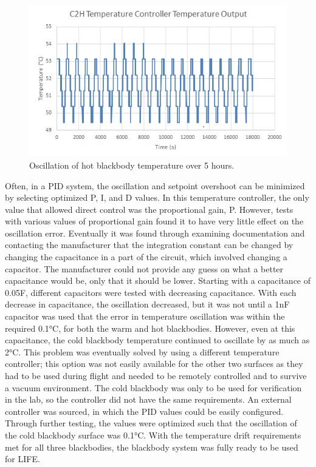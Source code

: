 \begin{figure}
    \centering
    \includegraphics{chap3_images/C2H_temperature_oscillation_excel.png}
    \caption{Oscillation of hot blackbody temperature over 5 hours.}
    \label{fig:C2H_temp_oscillation}
\end{figure}

Often, in a PID system, the oscillation and setpoint overshoot can be minimized by selecting optimized P, I, and D values. In this temperature controller, the only value that allowed direct control was the proportional gain, P. However, tests with various values of proportional gain found it to have very little effect on the oscillation error. Eventually it was found through examining documentation and contacting the manufacturer that the integration constant can be changed by changing the capacitance in a part of the circuit, which involved changing a capacitor. The manufacturer could not provide any guess on what a better capacitance would be, only that it should be lower. Starting with a capacitance of 0.05{\textmu}F, different capacitors were tested with decreasing capacitance. With each decrease in capacitance, the oscillation decreased, but it was not until a 1nF capacitor was used that the error in temperature oscillation was within the required 0.1°C, for both the warm and hot blackbodies. However, even at this capacitance, the cold blackbody temperature continued to oscillate by as much as 2°C. This problem was eventually solved by using a different temperature controller; this option was not easily available for the other two surfaces as they had to be used during flight and needed to be remotely controlled and to survive a vacuum environment. The cold blackbody was only to be used for verification in the lab, so the controller did not have the same requirements. An external controller was sourced, in which the PID values could be easily configured. Through further testing, the values were optimized such that the oscillation of the cold blackbody surface was 0.1°C. With the temperature drift requirements met for all three blackbodies, the blackbody system was fully ready to be used for LIFE.

